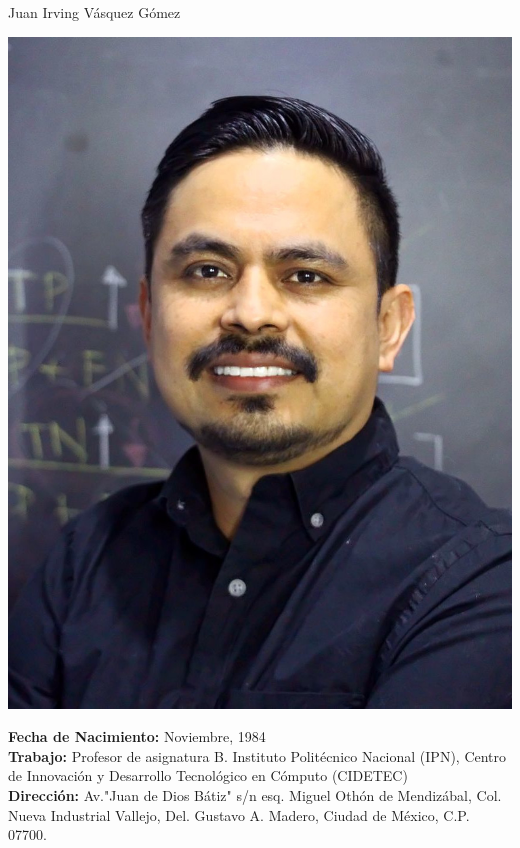 \documentclass[10pt]{article}
\begin{document}
\begin{center}
{\huge Juan Irving Vásquez Gómez}
\vspace{0.5cm}


\begin{minipage}[b]{0.30\linewidth}
	\centering
\includegraphics[width=\textwidth]{jivg_foto2}
\end{minipage}
\hspace{0.5cm}
\begin{minipage}[b]{0.65\linewidth}
\textbf{Fecha de Nacimiento:} Noviembre, 1984 \\
\textbf{Trabajo:} Profesor de asignatura B. Instituto Politécnico Nacional (IPN), Centro de Innovación y Desarrollo Tecnológico en Cómputo (CIDETEC) \href{https://www.cidetec.ipn.mx/}{\faExternalLink} \\ 
\textbf{Dirección:} Av."Juan de Dios Bátiz" s/n esq. Miguel Othón de Mendizábal, 
Col. Nueva Industrial Vallejo, Del. Gustavo A. Madero, Ciudad de México, C.P. 07700. \\

\end{minipage}
\end{center}
\end{document}
